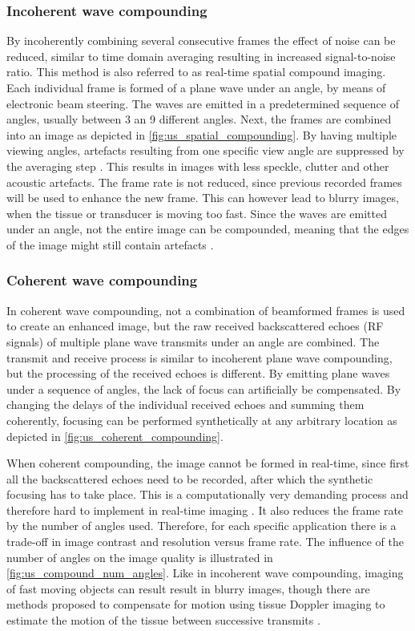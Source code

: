 \subsubsection{Incoherent wave compounding}
By incoherently combining several consecutive frames the effect of noise can be reduced, similar to time domain averaging resulting in increased signal-to-noise ratio. This method is also referred to as real-time spatial compound imaging. Each individual frame is formed of a plane wave under an angle, by means of electronic beam steering. The waves are emitted in a predetermined sequence of angles, usually between 3 an 9 different angles. Next, the frames are combined into an image as depicted in \autoref{fig:us_spatial_compounding}. By having multiple viewing angles, artefacts resulting from one specific view angle are suppressed by the averaging step \cite{entrekin_real-time_2001}. This results in images with less speckle, clutter and other acoustic artefacts. The frame rate is not reduced, since previous recorded frames will be used to enhance the new frame. This can however lead to blurry images, when the tissue or transducer is moving too fast. Since the waves are emitted under an angle, not the entire image can be compounded, meaning that the edges of the image might still contain artefacts \cite{entrekin_real-time_2001}. 

\subsubsection{Coherent wave compounding}
In coherent wave compounding, not a combination of beamformed frames is used to create an enhanced image, but the raw received backscattered echoes (RF signals) of multiple plane wave transmits under an angle are combined. The transmit and receive process is similar to incoherent plane wave compounding, but the processing of the received echoes is different. By emitting plane waves under a sequence of angles, the lack of focus can artificially be compensated. By changing the delays of the individual received echoes and summing them coherently, focusing can be performed synthetically at any arbitrary location as depicted in \autoref{fig:us_coherent_compounding}. 

When coherent compounding, the image cannot be formed in real-time, since first all the backscattered echoes need to be recorded, after which the synthetic focusing has to take place. This is a computationally very demanding process and therefore hard to implement in real-time imaging \cite{yiu_gpu-based_2011}. It also reduces the frame rate by the number of angles used. Therefore, for each specific application there is a trade-off in image contrast and resolution versus frame rate. The influence of the number of angles on the image quality is illustrated in \autoref{fig:us_compound_num_angles}. Like in incoherent wave compounding, imaging of fast moving objects can result result in blurry images, though there are methods proposed to compensate for motion using tissue Doppler imaging to estimate the motion of the tissue between successive transmits \cite{poree_high-frame-rate_2016}. 

